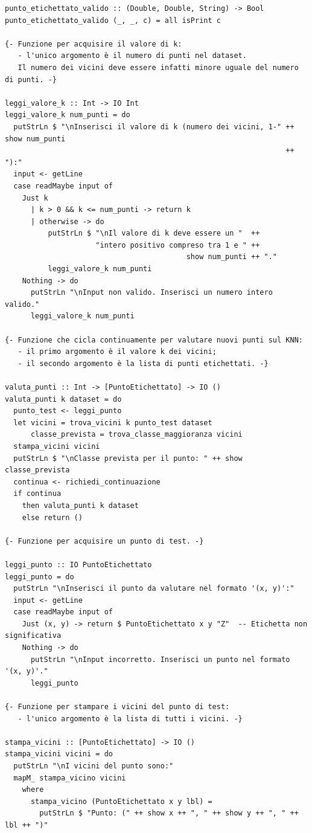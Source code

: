 \documentclass[11pt]{article}
\theoremstyle{definition}
\begin{document}
\begin{verbatim}
punto_etichettato_valido :: (Double, Double, String) -> Bool
punto_etichettato_valido (_, _, c) = all isPrint c

{- Funzione per acquisire il valore di k:
   - l'unico argomento è il numero di punti nel dataset.
   Il numero dei vicini deve essere infatti minore uguale del numero di punti. -}

leggi_valore_k :: Int -> IO Int
leggi_valore_k num_punti = do
  putStrLn $ "\nInserisci il valore di k (numero dei vicini, 1-" ++ show num_punti 
                                                                 ++ "):"
  input <- getLine
  case readMaybe input of
    Just k
      | k > 0 && k <= num_punti -> return k
      | otherwise -> do
          putStrLn $ "\nIl valore di k deve essere un "  ++ 
                     "intero positivo compreso tra 1 e " ++ 
                                          show num_punti ++ "."
          leggi_valore_k num_punti
    Nothing -> do
      putStrLn "\nInput non valido. Inserisci un numero intero valido."
      leggi_valore_k num_punti

{- Funzione che cicla continuamente per valutare nuovi punti sul KNN:
   - il primo argomento è il valore k dei vicini;
   - il secondo argomento è la lista di punti etichettati. -}

valuta_punti :: Int -> [PuntoEtichettato] -> IO ()
valuta_punti k dataset = do
  punto_test <- leggi_punto
  let vicini = trova_vicini k punto_test dataset
      classe_prevista = trova_classe_maggioranza vicini
  stampa_vicini vicini
  putStrLn $ "\nClasse prevista per il punto: " ++ show classe_prevista
  continua <- richiedi_continuazione
  if continua
    then valuta_punti k dataset
    else return ()

{- Funzione per acquisire un punto di test. -}

leggi_punto :: IO PuntoEtichettato
leggi_punto = do
  putStrLn "\nInserisci il punto da valutare nel formato '(x, y)':"
  input <- getLine
  case readMaybe input of
    Just (x, y) -> return $ PuntoEtichettato x y "Z"  -- Etichetta non significativa
    Nothing -> do
      putStrLn "\nInput incorretto. Inserisci un punto nel formato '(x, y)'."
      leggi_punto

{- Funzione per stampare i vicini del punto di test:
   - l'unico argomento è la lista di tutti i vicini. -}

stampa_vicini :: [PuntoEtichettato] -> IO ()
stampa_vicini vicini = do
  putStrLn "\nI vicini del punto sono:"
  mapM_ stampa_vicino vicini
    where
      stampa_vicino (PuntoEtichettato x y lbl) =
        putStrLn $ "Punto: (" ++ show x ++ ", " ++ show y ++ ", " ++ lbl ++ ")"


\end{verbatim}
\end{document}
